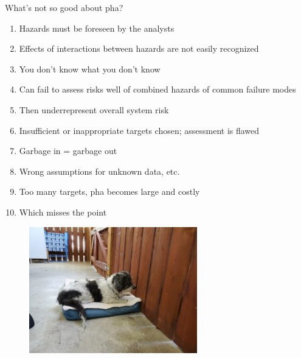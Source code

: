 \documentclass[aspectratio=1610,pdftex,dvipsnames,compress,xcolor={dvipsnames}]{beamer}
\newcommand{\acs}{\acrshort} %
\begin{document}
\begin{frame}{What's not so good about \acs{pha}?}
    \begin{enumerate}[series=outerlist,topsep=0pt,itemsep=5pt,leftmargin=*,label=(\arabic*)]
        \item[]Hazards must be foreseen by the analysts  
        \item[]Effects of interactions between hazards are not easily recognized  
        \item[]You don't know what you don't know  
        \item[]Can fail to assess risks well of combined hazards of common failure modes  
        \item[]Then underrepresent overall system risk
        \item[]Insufficient or inappropriate targets chosen; assessment is flawed
        \item[]Garbage in = garbage out  
        \item[]Wrong assumptions for unknown data, etc.
        \item[]Too many targets, \acs{pha} becomes large and costly  
        \item[]Which misses the point
    \end{enumerate}
\end{frame}


\begin{frame}[plain]{}
    \begin{figure}
        \centering
        \includegraphics[width=0.65\textwidth]{final.jpg}
    \end{figure}
\end{frame}
\end{document}
